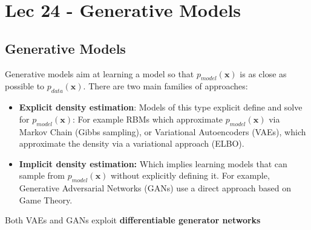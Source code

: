 \chapter{Lec 24 - Generative Models}

\section{Generative Models}
Generative models aim at learning a model so that $p_{model}(\textbf{x})$ is as close as possible to $p_{data}(\textbf{x})$. There are two main families of approaches:
\begin{itemize}
    \item \textbf{Explicit density estimation}: Models of this type explicit define and solve for $p_{model}(\textbf{x})$: For example RBMs which approximate $p_{model}(\textbf{x})$ via Markov Chain (Gibbs sampling), or Variational Autoencoders (VAEs), which approximate  the density via a variational approach (ELBO).

    \item \textbf{Implicit density estimation:} Which implies learning models that can sample from $p_{model}(\textbf{x})$ without explicitly defining it. For example, Generative Adversarial Networks (GANs) use a direct approach based on Game Theory.
\end{itemize}
Both VAEs and GANs exploit \textbf{differentiable generator networks}

